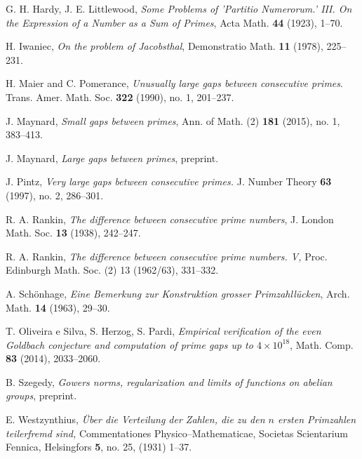 \documentclass[12pt]{amsart}
\numberwithin{equation}{section}  %
\theoremstyle{remark}
\theoremstyle{plain}
\numberwithin{equation}{section}
\renewcommand{\(}{\left(}
\renewcommand{\)}{\right)}
\begin{document}
\begin{thebibliography}{999}
G. H. Hardy, J. E. Littlewood, \emph{Some Problems of 'Partitio Numerorum.' III. On the Expression of a Number as a Sum of Primes}, Acta Math. \textbf{44} (1923), 1--70.

 H. Iwaniec, \emph{On the problem of Jacobsthal}, Demonstratio
Math. \textbf{11} (1978), 225--231.

 H. Maier and C. Pomerance, {\it Unusually large gaps
between consecutive primes}. Trans. Amer. Math. Soc. {\bf 322} (1990), no. 1, 201--237.

J. Maynard, \emph{Small gaps between primes}, Ann. of Math. (2) \textbf{181} (2015), no. 1, 383--413.

J. Maynard, \emph{Large gaps between primes}, preprint.

 J. Pintz, {\it Very large gaps between consecutive primes.}
J. Number Theory {\bf 63} (1997), no. 2, 286--301.

 R. A. Rankin, \textit{The difference between consecutive prime
numbers}, J. London Math. Soc. \textbf{13} (1938), 242--247.

 R. A. Rankin, \emph{The difference between consecutive prime numbers. V,} Proc. Edinburgh Math. Soc. (2) 13 (1962/63), 331--332.

 A. Sch\"onhage, \emph{Eine Bemerkung zur Konstruktion 
grosser Primzahll\"ucken}, Arch. Math. \textbf{14} (1963), 29--30.

 T. Oliveira e Silva, S. Herzog, S. Pardi, \emph{Empirical verification of the even Goldbach conjecture and computation of prime gaps up to $4 \times 10^{18}$}, Math. Comp. \textbf{83} (2014), 2033--2060.

B. Szegedy, \emph{Gowers norms, regularization and limits of functions on abelian groups}, preprint.

 E. Westzynthius, \emph{\"Uber die Verteilung der Zahlen, 
die zu den $n$ ersten Primzahlen teilerfremd sind,} Commentationes 
Physico--Mathematicae, 
Societas Scientarium Fennica, Helsingfors \textbf{5}, no. 25, (1931) 1--37.

\end{thebibliography}
\end{document}
